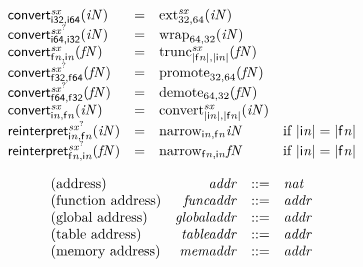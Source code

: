 $$
\begin{array}{@{}lcl@{}l@{}}
{{\mathsf{convert}}{{{}_{\mathsf{i{\scriptstyle32}}, \mathsf{i{\scriptstyle64}}}^{{\mathit{sx}}}}}}{({\mathit{iN}})} &=& {{{{\mathrm{ext}}}_{32, 64}^{{\mathit{sx}}}}}{({\mathit{iN}})} &  \\
{{\mathsf{convert}}{{{}_{\mathsf{i{\scriptstyle64}}, \mathsf{i{\scriptstyle32}}}^{{{\mathit{sx}}^?}}}}}{({\mathit{iN}})} &=& {{{\mathrm{wrap}}}_{64, 32}}{({\mathit{iN}})} &  \\
{{\mathsf{convert}}{{{}_{{\mathsf{f}}{{\mathit{n}}}, {\mathsf{i}}{{\mathit{n}}}}^{{\mathit{sx}}}}}}{({\mathit{fN}})} &=& {{{{\mathrm{trunc}}}_{{|{\mathsf{f}}{{\mathit{n}}}|}, {|{\mathsf{i}}{{\mathit{n}}}|}}^{{\mathit{sx}}}}}{({\mathit{fN}})} &  \\
{{\mathsf{convert}}{{{}_{\mathsf{f{\scriptstyle32}}, \mathsf{f{\scriptstyle64}}}^{{{\mathit{sx}}^?}}}}}{({\mathit{fN}})} &=& {{{\mathrm{promote}}}_{32, 64}}{({\mathit{fN}})} &  \\
{{\mathsf{convert}}{{{}_{\mathsf{f{\scriptstyle64}}, \mathsf{f{\scriptstyle32}}}^{{{\mathit{sx}}^?}}}}}{({\mathit{fN}})} &=& {{{\mathrm{demote}}}_{64, 32}}{({\mathit{fN}})} &  \\
{{\mathsf{convert}}{{{}_{{\mathsf{i}}{{\mathit{n}}}, {\mathsf{f}}{{\mathit{n}}}}^{{\mathit{sx}}}}}}{({\mathit{iN}})} &=& {{{{\mathrm{convert}}}_{{|{\mathsf{i}}{{\mathit{n}}}|}, {|{\mathsf{f}}{{\mathit{n}}}|}}^{{\mathit{sx}}}}}{({\mathit{iN}})} &  \\
{{\mathsf{reinterpret}}{{{}_{{\mathsf{i}}{{\mathit{n}}}, {\mathsf{f}}{{\mathit{n}}}}^{{{\mathit{sx}}^?}}}}}{({\mathit{iN}})} &=& {{{\mathrm{narrow}}}_{{\mathsf{i}}{{\mathit{n}}}, {\mathsf{f}}{{\mathit{n}}}}}{{\mathit{iN}}} &\quad
  \mbox{if}~{|{\mathsf{i}}{{\mathit{n}}}|} = {|{\mathsf{f}}{{\mathit{n}}}|} \\
{{\mathsf{reinterpret}}{{{}_{{\mathsf{f}}{{\mathit{n}}}, {\mathsf{i}}{{\mathit{n}}}}^{{{\mathit{sx}}^?}}}}}{({\mathit{fN}})} &=& {{{\mathrm{narrow}}}_{{\mathsf{f}}{{\mathit{n}}}, {\mathsf{i}}{{\mathit{n}}}}}{{\mathit{fN}}} &\quad
  \mbox{if}~{|{\mathsf{i}}{{\mathit{n}}}|} = {|{\mathsf{f}}{{\mathit{n}}}|} \\
\end{array}
$$

$$
\begin{array}{@{}lrrl@{}l@{}}
\mbox{(address)} & {\mathit{addr}} &::=& {\mathit{nat}} \\
\mbox{(function address)} & {\mathit{funcaddr}} &::=& {\mathit{addr}} \\
\mbox{(global address)} & {\mathit{globaladdr}} &::=& {\mathit{addr}} \\
\mbox{(table address)} & {\mathit{tableaddr}} &::=& {\mathit{addr}} \\
\mbox{(memory address)} & {\mathit{memaddr}} &::=& {\mathit{addr}} \\
\end{array}
$$

